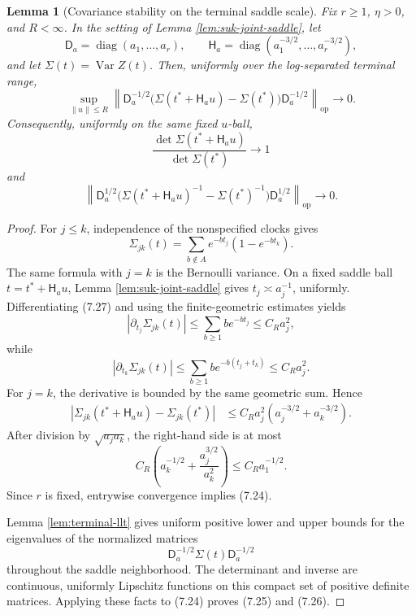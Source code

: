 \documentclass[11pt]{article}
\newtheorem{lemma}[theorem]{Lemma}
\theoremstyle{remark}
\newcommand{\Var}{\operatorname{Var}}
\newcommand{\diag}{\operatorname{diag}}
\begin{document}
\begin{lemma}[Covariance stability on the terminal saddle scale]
\label{lem:terminal-covariance-stability}
Fix \(r\ge1\), \(\eta>0\), and \(R<\infty\).  In the setting of Lemma
\ref{lem:suk-joint-saddle}, let
\[
        \mathsf D_a=\diag(a_1,\ldots,a_r),
        \qquad
        \mathsf H_a=\diag(a_1^{-3/2},\ldots,a_r^{-3/2}),
\]
and let \(\Sigma(t)=\Var Z(t)\).  Then, uniformly over the log-separated
terminal range,
\[
\sup_{\|u\|\le R}
\left\|
\mathsf D_a^{-1/2}
\bigl(\Sigma(t^*+\mathsf H_au)-\Sigma(t^*)\bigr)
\mathsf D_a^{-1/2}
\right\|_{\mathrm{op}}
\longrightarrow0.
\tag{7.24}
\]
Consequently, uniformly on the same fixed \(u\)-ball,
\[
        \frac{\det\Sigma(t^*+\mathsf H_au)}{\det\Sigma(t^*)}
        \longrightarrow1
\tag{7.25}
\]
and
\[
\left\|
\mathsf D_a^{1/2}
\bigl(\Sigma(t^*+\mathsf H_au)^{-1}-\Sigma(t^*)^{-1}\bigr)
\mathsf D_a^{1/2}
\right\|_{\mathrm{op}}
\longrightarrow0.
\tag{7.26}
\]
\end{lemma}

\begin{proof}
For \(j\le k\), independence of the nonspecified clocks gives
\[
        \Sigma_{jk}(t)
        =\sum_{b\notin A}e^{-bt_j}(1-e^{-bt_k}).
        \tag{7.27}
\]
The same formula with \(j=k\) is the Bernoulli variance.  On a fixed saddle
ball \(t=t^*+\mathsf H_au\), Lemma \ref{lem:suk-joint-saddle} gives
\(t_j\asymp a_j^{-1}\), uniformly.  Differentiating (7.27) and using the
finite-geometric estimates yields
\[
        |\partial_{t_j}\Sigma_{jk}(t)|
        \le\sum_{b\ge1}b e^{-bt_j}\le C_Ra_j^2,
\]
while
\[
        |\partial_{t_k}\Sigma_{jk}(t)|
        \le\sum_{b\ge1}b e^{-b(t_j+t_k)}\le C_Ra_j^2.
\]
For \(j=k\), the derivative is bounded by the same geometric sum.  Hence
\[
\begin{aligned}
|\Sigma_{jk}(t^*+\mathsf H_au)-\Sigma_{jk}(t^*)|
&\le C_Ra_j^2(a_j^{-3/2}+a_k^{-3/2}).
\end{aligned}
\]
After division by \(\sqrt{a_ja_k}\), the right-hand side is at most
\[
        C_R\left(a_k^{-1/2}+\frac{a_j^{3/2}}{a_k^2}\right)
        \le C_Ra_1^{-1/2}.
\]
Since \(r\) is fixed, entrywise convergence implies (7.24).

Lemma \ref{lem:terminal-llt} gives uniform positive lower and upper bounds for
the eigenvalues of the normalized matrices
\[
        \mathsf D_a^{-1/2}\Sigma(t)\mathsf D_a^{-1/2}
\]
throughout the saddle neighborhood.  The determinant and inverse are
continuous, uniformly Lipschitz functions on this compact set of positive
definite matrices.  Applying these facts to (7.24) proves (7.25) and (7.26).
\end{proof}
\end{document}
